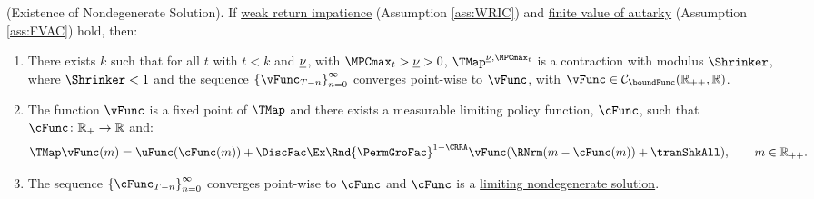 \documentclass[BufferStockTheory]{subfiles}
\begin{document}
\hypertarget{Sufficient-Conditions-For-Nondegenerate-Solution}{}
\begin{theorem}(Existence of Nondegenerate Solution). \label{thm:convgtobellman}
If \hyperlink{WRIC}{weak return impatience} (Assumption \ref{ass:WRIC}) and \hyperlink{FVAC}{finite value of autarky} (Assumption \ref{ass:FVAC}) hold, then:
%
\begin{enumerate}[label=(\roman*)]
\item There exists $k$ such that for all $t$ with $t<k$ and $\underline{\nu}$, with $\MPCmax_{t}>\MPCminInf>0$, $\TMap^{\MPCminInf, \MPCmax_{t}}$ is a contraction with modulus $\Shrinker$, where $\Shrinker<1$ and the sequence $\left\{\vFunc_{T-n}\right\}_{n=0}^{\infty}$ converges point-wise to $\vFunc$, with $\vFunc \in \mathcal{C}_{\boundFunc}(\mathbb{R}_{++},\mathbb{R})$.
\item The function $\vFunc$ is a fixed point of $\TMap$ and there exists a measurable limiting policy function, $\cFunc$, such that $\cFunc\colon \mathbb{R}_{+}\rightarrow \mathbb{R}$ and:
\begin{equation}\label{eq:stationarybellman}
\TMap\vFunc(m) =  \uFunc(\cFunc(m)) + \DiscFac\Ex \Rnd{\PermGroFac}^{1-\CRRA}\vFunc(\RNrm(m-\cFunc(m)) + \tranShkAll) , \qquad m\in \mathbb{R}_{++}. 
\end{equation}
\item  The sequence $\left\{\cFunc_{T-n}\right\}_{n=0}^{\infty}$ converges point-wise to $\cFunc$ and $\cFunc$  is a \hyperlink{Definition-of-a-Nondegenerate-Solution}{limiting nondegenerate solution}.
\end{enumerate}
\end{theorem}
\end{document}
